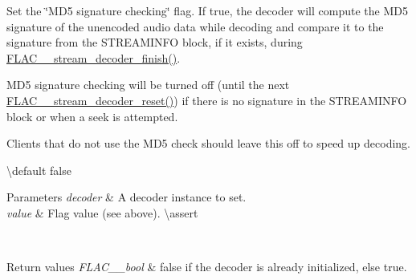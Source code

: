 Set the \char`\"{}\+M\+D5 signature checking\char`\"{} flag. If {\ttfamily true}, the decoder will compute the M\+D5 signature of the unencoded audio data while decoding and compare it to the signature from the S\+T\+R\+E\+A\+M\+I\+N\+FO block, if it exists, during \mbox{\hyperlink{group__flac__stream__decoder_gaa51bb38f762ee11b320a0839f165c5ce}{F\+L\+A\+C\+\_\+\+\_\+stream\+\_\+decoder\+\_\+finish()}}.

M\+D5 signature checking will be turned off (until the next \mbox{\hyperlink{group__flac__stream__decoder_ga2342cf4f3caf9ad20fca1373aaea0c27}{F\+L\+A\+C\+\_\+\+\_\+stream\+\_\+decoder\+\_\+reset()}}) if there is no signature in the S\+T\+R\+E\+A\+M\+I\+N\+FO block or when a seek is attempted.

Clients that do not use the M\+D5 check should leave this off to speed up decoding.

\textbackslash{}default {\ttfamily false} 
\begin{DoxyParams}{Parameters}
{\em decoder} & A decoder instance to set. \\
\hline
{\em value} & Flag value (see above). \textbackslash{}assert 
\begin{DoxyCode}{1}
\end{DoxyCode}
 \\
\hline
\end{DoxyParams}

\begin{DoxyRetVals}{Return values}
{\em F\+L\+A\+C\+\_\+\+\_\+bool} & {\ttfamily false} if the decoder is already initialized, else {\ttfamily true}. \\
\hline
\end{DoxyRetVals}
\mbox{\label{group__flac__stream__decoder_ga0fb395d7c18c136d5a84869f6f2d736f}} 
